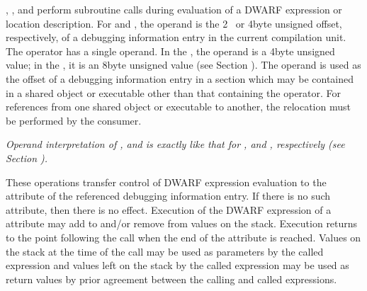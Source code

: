 \begin{enumerate}[1. ]
\itembfnl{\DWOPcalltwoTARG, \DWOPcallfourTARG, \DWOPcallrefTARG}
\DWOPcalltwoNAME, 
\DWOPcallfourNAME, 
and \DWOPcallrefNAME{} perform
subroutine calls during evaluation of a DWARF expression or
location description. 
For \DWOPcalltwoNAME{} and \DWOPcallfour{}, 
the operand is the 2\dash~ or 4\dash byte unsigned offset, respectively,
of a debugging information entry in the current compilation
unit. The \DWOPcallref{} operator has a single operand. In the
\thirtytwobitdwarfformat,
the operand is a 4\dash byte unsigned value;
in the \sixtyfourbitdwarfformat, it is an 8\dash byte unsigned value
(see Section ). 
The operand is used as the offset of a
debugging information entry in a 
\dotdebuginfo{}
section which may be contained in a shared object or executable
other than that containing the operator. For references from
one shared object or executable to another, the relocation
must be performed by the consumer.  

\textit{Operand interpretation of
\DWOPcalltwo, \DWOPcallfour{} and \DWOPcallref{} is exactly like
that for \DWFORMreftwo, \DWFORMreffour{} and \DWFORMrefaddr,
respectively  
(see Section  ).  
}

These operations transfer
control of DWARF expression evaluation to 
the 
\DWATlocation{}
attribute of the referenced debugging information entry. If
there is no such attribute, then there is no effect. Execution
of the DWARF expression of 
a 
\DWATlocation{} attribute may add
to and/or remove from values on the stack. Execution returns
to the point following the call when the end of the attribute
is reached. Values on the stack at the time of the call may be
used as parameters by the called expression and values left on
the stack by the called expression may be used as return values
by prior agreement between the calling and called expressions.
\end{enumerate}

